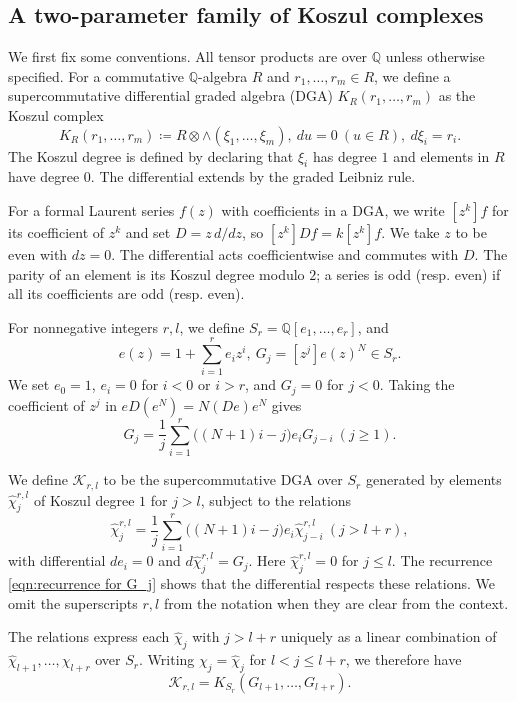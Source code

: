 \documentclass[reqno]{amsart}
\theoremstyle{definition}
\theoremstyle{remark}
\newcommand{\QQ}{\mathbb{Q}}
\newcommand{\cak}{\mathcal{K}}
\newcommand{\whc}{\widehat{\chi}}
\begin{document}
\subsection{A two-parameter family of Koszul complexes}

We first fix some conventions. All tensor products are over $\QQ$ unless otherwise specified. For a commutative $\QQ$-algebra $R$ and $r_1,\dots,r_m\in R$, we define a supercommutative differential graded algebra (DGA) $K_R(r_1,\dots,r_m)$ as the Koszul complex \[K_R(r_1,\dots,r_m)\coloneqq R\otimes\wedge(\xi_1,\dots,\xi_m),\ du=0\ (u\in R),\ d\xi_i=r_i.\]
The Koszul degree is defined by declaring that $\xi_i$ has degree $1$ and elements in $R$ have degree $0$. The differential extends by the graded Leibniz rule.

For a formal Laurent series $f(z)$ with coefficients in a DGA, we write $[z^k]f$ for its coefficient of $z^k$ and set $D=z\,d/dz$, so $[z^k]Df=k[z^k]f$. We take $z$ to be even with $dz=0$. The differential acts coefficientwise and commutes with $D$. The parity of an element is its Koszul degree modulo $2$; a series is odd (resp. even) if all its coefficients are odd (resp. even).

For nonnegative integers $r,l$, we define $S_r=\QQ[e_1,\dots,e_r]$, and
\[e(z)=1+\sum_{i=1}^r e_i z^i,\ G_j=[z^j]e(z)^N\in S_r.\]
We set $e_0=1$, $e_i=0$ for $i<0$ or $i>r$, and $G_j=0$ for $j<0$. Taking the coefficient of $z^j$ in $eD(e^N)=N(De)e^N$ gives
\begin{equation}\label{eqn:recurrence for G_j}G_j=\frac{1}{j}\sum_{i=1}^r\bigl((N+1)i-j\bigr)e_iG_{j-i}\ (j\ge1).
\end{equation}

We define $\cak_{r,l}$ to be the supercommutative DGA over $S_r$ generated by elements $\whc_j^{r,l}$ of Koszul degree $1$ for $j>l$, subject to the relations \begin{equation}\label{eqn:defn of whc_j}
\whc_j^{r,l}=\frac{1}{j}\sum_{i=1}^r\bigl((N+1)i-j\bigr)e_i\whc_{j-i}^{r,l}\ (j>l+r),
\end{equation}with differential $de_i=0$ and $d\whc_j^{r,l}=G_j$. Here $\whc_j^{r,l}=0$ for $j\le l$. The recurrence \eqref{eqn:recurrence for G_j} shows that the differential respects these relations. We omit the superscripts $r,l$ from the notation when they are clear from the context.

The relations express each $\whc_j$ with $j>l+r$ uniquely as a linear combination of $\whc_{l+1},\dots,\whc_{l+r}$ over $S_r$. Writing $\chi_j=\whc_j$ for $l<j\le l+r$, we therefore have
\[\cak_{r,l}=K_{S_r}(G_{l+1},\dots,G_{l+r}).\]
\end{document}
